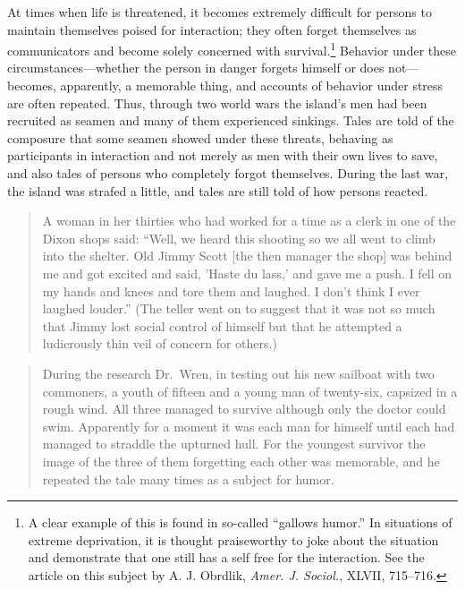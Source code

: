 \documentclass[openany,nobib]{tufte-book}
\begin{document}
At times when life is threatened, it becomes extremely difficult for
persons to maintain themselves poised for interaction; they often forget
themselves as communicators and become solely concerned with
survival.\footnote{A clear example of this is found in so-called
  ``gallows humor.'' In situations of extreme deprivation, it is thought
  praiseworthy to joke about the situation and demonstrate that one
  still has a self free for the interaction. See the article on this
  subject by A. J. Obrdlik, \emph{Amer. J. Sociol.}, XLVII, 715--716.}
Behavior under these circumstances---whether the person in danger
forgets himself or does not---becomes, apparently, a memorable thing,
and accounts of behavior under stress are often repeated. Thus, through
two world wars the island's men had been recruited as seamen and many of
them experienced sinkings. Tales are told of the composure that some
seamen showed under these threats, behaving as participants in
interaction and not merely as men with their own lives to save, and also
tales of persons who completely forgot themselves. During the last war,
the island was strafed a little, and tales are still told of how persons
reacted.

\begin{quote}
A woman in her thirties who had worked for a time as a clerk in one of
the Dixon shops said: ``Well, we heard this shooting so we all went to
climb into the shelter. Old Jimmy Scott {[}the then manager the shop{]}
was behind me and got excited and said, 'Haste du lass,' and gave me a
push. I fell on my hands and knees and tore them and laughed. I don't
think I ever laughed louder.'' (The teller went on to suggest that it
was not so much that Jimmy lost social control of himself but that he
attempted a ludicrously thin veil of concern for others.)
\end{quote}

\begin{quote}
During the research Dr.~Wren, in testing out his new sailboat with two
commoners, a youth of fifteen and a young man of twenty-six, capsized in
a rough wind. All three managed to survive although only the doctor
could swim. Apparently for a moment it was each man for himself until
each had managed to straddle the upturned hull. For the youngest
survivor the image of the three of them forgetting each other was
memorable, and he repeated the tale many times as a subject for humor.
\end{quote}
\end{document}
